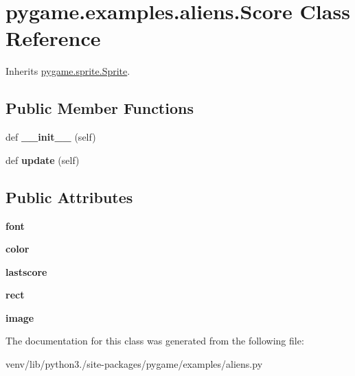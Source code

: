 \hypertarget{classpygame_1_1examples_1_1aliens_1_1_score}{}\section{pygame.\+examples.\+aliens.\+Score Class Reference}
\label{classpygame_1_1examples_1_1aliens_1_1_score}


Inherits \hyperlink{classpygame_1_1sprite_1_1_sprite}{pygame.\+sprite.\+Sprite}.

\subsection*{Public Member Functions}
\begin{DoxyCompactItemize}
\item 
\mbox{\label{classpygame_1_1examples_1_1aliens_1_1_score_af6490c7bb082824907f3b84e54638f84}} 
def {\bfseries \+\_\+\+\_\+init\+\_\+\+\_\+} (self)
\item 
\mbox{\label{classpygame_1_1examples_1_1aliens_1_1_score_a72c6aed8f9791d66698b71e7ea1824c9}} 
def {\bfseries update} (self)
\end{DoxyCompactItemize}
\subsection*{Public Attributes}
\begin{DoxyCompactItemize}
\item 
\mbox{\label{classpygame_1_1examples_1_1aliens_1_1_score_afdd3e17f69f852103f46ed0037b6fff6}} 
{\bfseries font}
\item 
\mbox{\label{classpygame_1_1examples_1_1aliens_1_1_score_a274cad5e780b27cc96e7d018c3378a22}} 
{\bfseries color}
\item 
\mbox{\label{classpygame_1_1examples_1_1aliens_1_1_score_add2c864fd237b41f13d8e141395217a2}} 
{\bfseries lastscore}
\item 
\mbox{\label{classpygame_1_1examples_1_1aliens_1_1_score_aad73cc55a725c3094e8bf992a1581661}} 
{\bfseries rect}
\item 
\mbox{\label{classpygame_1_1examples_1_1aliens_1_1_score_a5ad8a8a102f3848c1e3ed0d564d6d0b0}} 
{\bfseries image}
\end{DoxyCompactItemize}


The documentation for this class was generated from the following file\+:\begin{DoxyCompactItemize}
\item 
venv/lib/python3./site-\/packages/pygame/examples/aliens.\+py\end{DoxyCompactItemize}
